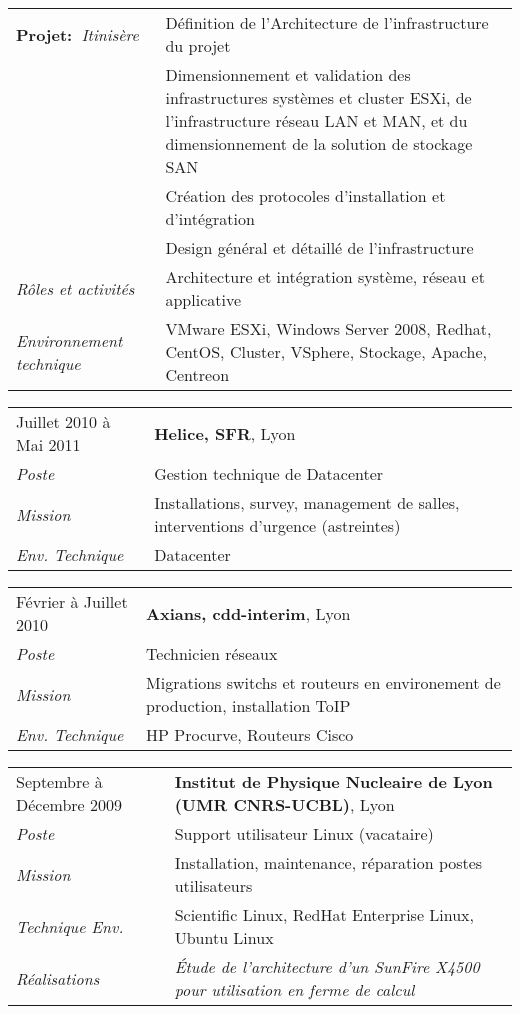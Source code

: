 \documentclass[a4paper,8pt]{article}
\begin{document}
\begin{tabular}{P{3.5cm}|p{13cm}}
\textbf{Projet:~}\textit{Itinisère}	& Définition de l’Architecture de l'infrastructure du projet\\
				& Dimensionnement et validation des infrastructures systèmes et cluster ESXi, de l'infrastructure réseau LAN et MAN, et du dimensionnement de la solution de stockage SAN\\
				& Création des protocoles d'installation et d'intégration\\
				& Design général et détaillé de l'infrastructure\\
\textsl{Rôles et activités}	& Architecture et intégration système, réseau et applicative\\
\textsl{Environnement technique} & VMware ESXi, Windows Server 2008, Redhat, CentOS, Cluster, VSphere, Stockage, Apache, Centreon\\
\end{tabular}
\begin{tabular}{P{3.5cm}|p{13cm}}
Juillet 2010 à Mai 2011	& \textbf{Helice, SFR}, Lyon\\
\textsl{Poste}			& Gestion technique de Datacenter\\
\textsl{Mission}		& Installations, survey, management de salles, interventions d'urgence (astreintes)\\
\textsl{Env. Technique}		& Datacenter\\
\end{tabular}
\begin{tabular}{P{3.5cm}|p{13cm}}
Février à Juillet 2010	& \textbf{Axians, cdd-interim}, Lyon\\
\textsl{Poste}	 		& Technicien réseaux\\
\textsl{Mission}		& Migrations switchs et routeurs en environement de production, installation ToIP\\
\textsl{Env. Technique}		& HP Procurve, Routeurs Cisco\\
\end{tabular}
\begin{tabular}{P{3.5cm}|p{13cm}}
Septembre à Décembre 2009	& \textbf{Institut de Physique Nucleaire de Lyon (UMR CNRS-UCBL)}, Lyon\\
\textsl{Poste}	 		& Support utilisateur Linux (vacataire)\\
\textsl{Mission} 		& Installation, maintenance, réparation postes utilisateurs\\
\textsl{Technique Env.}		& Scientific Linux, RedHat Enterprise Linux, Ubuntu Linux\\
\textsl{Réalisations}		& \textsl{\'{E}tude de l'architecture d'un SunFire X4500 pour utilisation en ferme de calcul}\\
\end{tabular}
\end{document}
